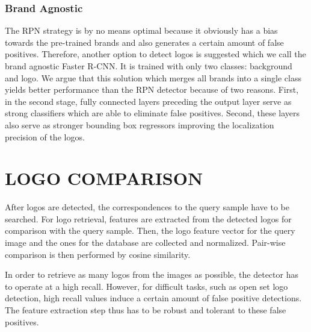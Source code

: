 \documentclass[a4paper,twoside]{article}
\begin{document}
\subsubsection*{Brand Agnostic}
\vspace*{-2.5mm}
The \ac{RPN} strategy is by no means optimal because it obviously has a bias towards the pre-trained brands and also generates a certain amount of false positives.
Therefore, another option to detect logos is suggested which we call the brand agnostic Faster R-CNN. It is trained with only two classes: background and logo. We argue that this solution which merges all brands into a single class yields better performance than the \ac{RPN} detector because of two reasons. 
First, in the second stage, fully connected layers preceding the output layer serve as strong classifiers which are able to eliminate false positives.
Second, these layers also serve as stronger bounding box regressors improving the localization precision of the logos.


\section{\uppercase{Logo Comparison}}
\noindent After logos are detected, the correspondences to the query sample have to be searched. 
For logo retrieval, features are extracted from the detected logos for comparison with the query sample. Then, the logo feature vector for the query image and the ones for the database are collected and normalized. Pair-wise comparison is then performed by cosine similarity.

In order to retrieve as many logos from the images as possible, the detector has to operate at a high recall. However, for difficult tasks, such as open set logo detection, high recall values induce a certain amount of false positive detections. The feature extraction step thus has to be robust and tolerant to these false positives. 
%
%
%
\end{document}
